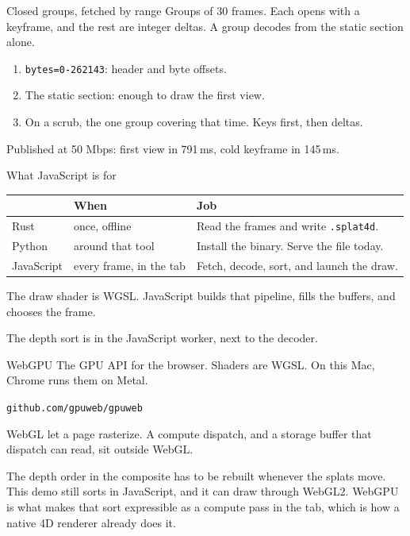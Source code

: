 \documentclass[aspectratio=169,10pt]{beamer}
\begin{document}
\begin{frame}{Closed groups, fetched by range}
  Groups of 30 frames. Each opens with a keyframe, and the rest are integer deltas. A group decodes from the static section alone.

  \vspace{0.6em}
  \begin{enumerate}
    \item \texttt{bytes=0-262143}: header and byte offsets.
    \item The static section: enough to draw the first view.
    \item On a scrub, the one group covering that time. Keys first, then deltas.
  \end{enumerate}

  \vspace{0.4em}
  Published at 50 Mbps: first view in 791\,ms, cold keyframe in 145\,ms.
\end{frame}

\begin{frame}{What JavaScript is for}
  \begin{tabular}{@{}llp{}@{}}
    \toprule
    & \textbf{When} & \textbf{Job} \\
    \midrule
    Rust & once, offline & Read the frames and write \texttt{.splat4d}. \\
    Python & around that tool & Install the binary. Serve the file today. \\
    JavaScript & every frame, in the tab & Fetch, decode, sort, and launch the draw. \\
    \bottomrule
  \end{tabular}

  \vspace{0.8em}
  The draw shader is WGSL. JavaScript builds that pipeline, fills the buffers, and chooses the frame.

  \vspace{0.5em}
  The depth sort is in the JavaScript worker, next to the decoder.
\end{frame}

\begin{frame}{WebGPU}
  The GPU API for the browser. Shaders are WGSL. On this Mac, Chrome runs them on Metal.

  \vspace{0.35em}
  \centering
  \texttt{github.com/gpuweb/gpuweb}

  \vspace{0.7em}
  \raggedright
  WebGL let a page rasterize. A compute dispatch, and a storage buffer that dispatch can read, sit outside WebGL.

  \vspace{0.55em}
  The depth order in the composite has to be rebuilt whenever the splats move. This demo still sorts in JavaScript, and it can draw through WebGL2. WebGPU is what makes that sort expressible as a compute pass in the tab, which is how a native 4D renderer already does it.
\end{frame}
\end{document}
